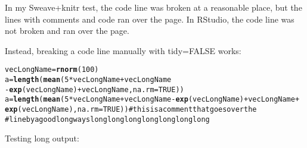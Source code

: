 \documentclass{article}\usepackage{graphicx, color}
\makeatletter
\newcommand{\hlfunctioncall}[1]{\textcolor[rgb]{0.501960784313725,0,0.329411764705882}{\textbf{#1}}}%
\newcommand{\hlcomment}[1]{\textcolor[rgb]{0.180392156862745,0.6,0.341176470588235}{#1}}%
\newenvironment{kframe}{%
 \def\at@end@of@kframe{}%
 \ifinner\ifhmode%
  \def\at@end@of@kframe{\end{minipage}}%
  \begin{minipage}{\columnwidth}%
 \fi\fi%
 \def\FrameCommand##1{\hskip\@totalleftmargin \hskip-\fboxsep
 \colorbox{shadecolor}{##1}\hskip-\fboxsep
     \hskip-\linewidth \hskip-\@totalleftmargin \hskip\columnwidth}%
 \MakeFramed {\advance\hsize-\width
   \@totalleftmargin\z@ \linewidth\hsize
   \@setminipage}}%
 {\par\unskip\endMakeFramed%
 \at@end@of@kframe}
\newenvironment{knitrout}{}{} %
\makeatother
\begin{document}
In my Sweave+knitr test, the code line was broken at a reasonable place, but the lines with comments and code ran over the page.
In RStudio, the code line was not broken and ran over the page.

Instead, breaking a code line manually with tidy=FALSE works:

\begin{knitrout}
\color{fgcolor}\begin{kframe}
\begin{alltt}
vecLongName = \hlfunctioncall{rnorm}(100)
a = \hlfunctioncall{length}(\hlfunctioncall{mean}(5 * vecLongName + vecLongName
  - \hlfunctioncall{exp}(vecLongName) + vecLongName, na.rm = TRUE))
a = \hlfunctioncall{length}(\hlfunctioncall{mean}(5 * vecLongName + vecLongName - \hlfunctioncall{exp}(vecLongName) + vecLongName +
  \hlfunctioncall{exp}(vecLongName), na.rm = TRUE)) \hlcomment{# this is a comment that goes over the }
\hlcomment{  # line by a good long ways long long long long long long long}
\end{alltt}
\end{kframe}
\end{knitrout}




Testing long output:
\end{document}
